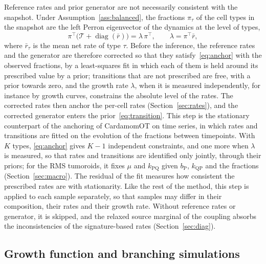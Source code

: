 \documentclass[a4paper, 11pt]{article}
\DeclareMathOperator{\diag}{diag}
\newcommand{\Tg}{\mathcal{T}}
\newcommand{\cP}{\mathrm{P}}
\newcommand{\cQ}{\mathrm{Q}}
\theoremstyle{plain}
\theoremstyle{remark}
\begin{document}
Reference rates and prior generator are not necessarily consistent with the snapshot. Under Assumption~\ref{ass:balanced}, the fractions $\pi_\tau$ of the cell types in the snapshot are the left Perron eigenvector of the dynamics at the level of types,
\begin{equation}\label{eq:anchor}
\pi^\top\bigl(\Tg + \diag(\bar r)\bigr) = \lambda\,\pi^\top, \qquad \lambda = \pi^\top\bar r,
\end{equation}
where $\bar r_\tau$ is the mean net rate of type $\tau$. Before the inference, the reference rates and the generator are therefore corrected so that they satisfy~\eqref{eq:anchor} with the observed fractions, by a least-squares fit in which each of them is held around its prescribed value by a prior; transitions that are not prescribed are free, with a prior towards zero, and the growth rate $\lambda$, when it is measured independently, for instance by growth curves, constrains the absolute level of the rates. The corrected rates then anchor the per-cell rates (Section~\ref{sec:rates}), and the corrected generator enters the prior~\eqref{eq:transition}. This step is the stationary counterpart of the anchoring of CardamomOT on time series, in which rates and transitions are fitted on the evolution of the fractions between timepoints. With $K$ types, \eqref{eq:anchor} gives $K - 1$ independent constraints, and one more when $\lambda$ is measured, so that rates and transitions are identified only jointly, through their priors; for the RMS tumoroids, it fixes $\mu$ and $k_{\cP\cQ}$ given $b_\cP$, $k_{\cQ\cP}$ and the fractions (Section~\ref{sec:macro}). The residual of the fit measures how consistent the prescribed rates are with stationarity. Like the rest of the method, this step is applied to each sample separately, so that samples may differ in their composition, their rates and their growth rate. Without reference rates or generator, it is skipped, and the relaxed source marginal of the coupling absorbs the inconsistencies of the signature-based rates (Section~\ref{sec:diag}).

\subsection{Growth function and branching simulations}\label{sec:branching}
\end{document}
